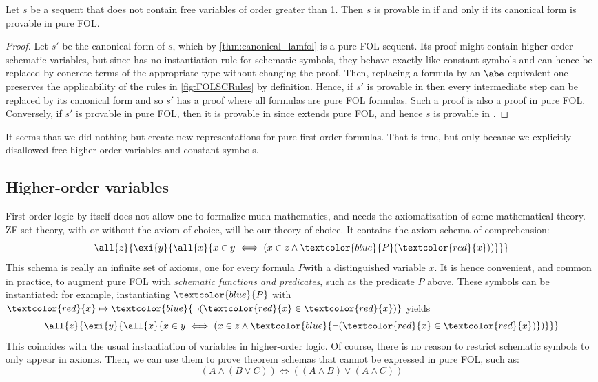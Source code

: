 \begin{theorem}
    \label{thm:sclamA_conservative}
    Let $s$ be a sequent that does not contain free variables of order greater than 1. Then $s$ is provable in \SClamA if and only if its canonical form is provable in pure FOL.
\end{theorem}

\begin{proof}
    Let $s'$ be the canonical form of $s$, which by \autoref{thm:canonical_lamfol} is a pure FOL sequent.
    Its proof might contain higher order schematic variables, but since \SClamA has no  instantiation rule for schematic symbols, they behave exactly like constant symbols and can hence be replaced by concrete terms of the appropriate type without changing the proof.
    Then, replacing a formula by an $\abe$-equivalent one preserves the applicability of the rules in \autoref{fig:FOLSCRules} by definition. Hence, if $s'$ is provable in \SClamA then every intermediate step can be replaced by its canonical form and so $s'$ has a proof where all formulas are pure FOL formulas. Such a proof is also a proof in pure FOL. Conversely, if $s'$ is provable in pure FOL, then it is provable in \SClamA since \SClamA extends pure FOL, and hence $s$ is provable in \SClamA.
\end{proof}


It seems that we did nothing but create new representations for pure first-order formulas. That is true, but only because we explicitly disallowed free higher-order variables and constant symbols.

\subsection{Higher-order variables}
\label{sec:schematic_variables}
First-order logic by itself does not allow one to formalize much mathematics, and needs the axiomatization of some mathematical theory. ZF set theory, with or without the axiom of choice, will be our theory of choice. It contains the axiom schema of comprehension:
\newcommand{\bluet}[1]{\textcolor{blue}{#1}}
\newcommand{\redt}[1]{\textcolor{red}{#1}}
$$\all{z}{\exi{y}{\all{x}{x \in y \iff (x \in z \land \bluet{P}(\redt{x}))}}}$$
This schema is really an infinite set of axioms, one for every formula $P$with a distinguished variable $x$. It is hence convenient, and common in practice, to augment pure FOL with \textit{schematic functions and predicates}, such as the predicate $P$ above. These symbols can be instantiated: for example, instantiating $\bluet{P}$ with $\redt{x} \mapsto \bluet{\neg(\redt{x} \in \redt{x})}$ yields
$$\all{z}{\exi{y}{\all{x}{x \in y \iff (x \in z \land \bluet{\neg(\redt{x} \in \redt{x})})}}}$$
This coincides with the usual instantiation of variables in higher-order logic. 
Of course, there is no reason to restrict schematic symbols to only appear in axioms. Then, we can use them to prove theorem schemas that cannot be expressed in pure FOL, such as:
$$
(A \land (B \lor C)) \iff ((A \land B) \lor (A \land C))
$$

